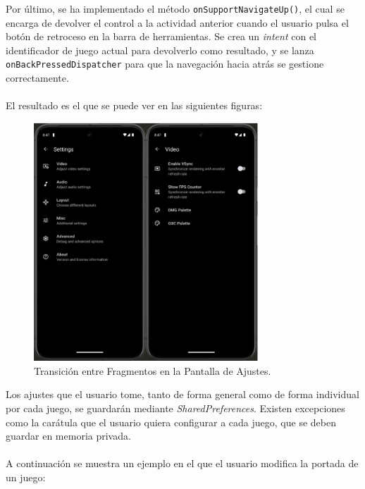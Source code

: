 Por último, se ha implementado el método \texttt{onSupportNavigateUp()}, el cual se encarga de devolver el control a la actividad anterior cuando el usuario pulsa el botón de retroceso en la barra de herramientas. Se crea un \textit{intent} con el identificador de juego actual para devolverlo como resultado, y se lanza \texttt{onBackPressedDispatcher} para que la navegación hacia atrás se gestione correctamente.
\\\\
El resultado es el que se puede ver en las siguientes figuras:

\begin{figure}[H]
    \centering
    \includegraphics[width=0.75\textwidth]{include/images/settings_fragments.png}
    \caption{Transición entre Fragmentos en la Pantalla de Ajustes.}\label{figure:settingsFragments}
\end{figure}

Los ajustes que el usuario tome, tanto de forma general como de forma individual por cada juego, se guardarán mediante \textit{SharedPreferences}. Existen excepciones como la carátula que el usuario quiera configurar a cada juego, que se deben guardar en memoria privada.
\\\\
A continuación se muestra un ejemplo en el que el usuario modifica la portada de un juego:

